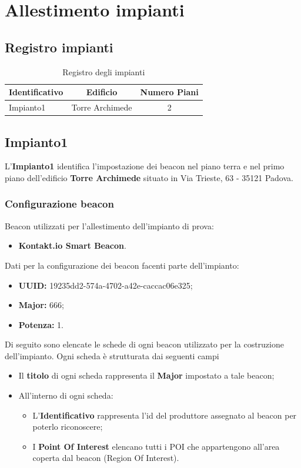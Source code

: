 \documentclass[../SperimentazioniPratiche.tex]{subfiles}
\begin{document}
\section{Allestimento impianti}
\label{sec:AllestimentoImpianto}

	\subsection{Registro impianti}
	
	\begin{table} [h]
		\centering
		\begin{tabular}{l|cc}
			\toprule
			\textbf{Identificativo} & \textbf{Edificio} & \textbf{Numero Piani}		\\
			\toprule
			Impianto1 & Torre Archimede & 2 \\
			\bottomrule
		\end{tabular}
		\caption{Registro degli impianti}
		\label{tab:RegistroImpianti}
	\end{table}
	
	
	\newpage
	\subsection{Impianto1}
		L'\textbf{Impianto1} identifica l'impostazione dei beacon nel piano terra e nel primo piano dell'edificio \textbf{Torre Archimede} situato in Via Trieste, 63 - 35121 Padova.
		
		\subsubsection{Configurazione beacon}
		Beacon utilizzati per l'allestimento dell'impianto di prova:
		\begin{itemize}
			\item[] \textbf{Kontakt.io Smart Beacon}.
		\end{itemize}
		Dati per la configurazione dei beacon facenti parte dell'impianto:
		\begin{itemize}
			\item[] \textbf{UUID:} 19235dd2-574a-4702-a42e-caccac06e325;
			\item[] \textbf{Major:} 666;
			\item[] \textbf{Potenza:} 1.
		\end{itemize}

		
		Di seguito sono elencate le schede di ogni beacon utilizzato per la costruzione dell'impianto. Ogni scheda è strutturata dai seguenti campi
		\begin{itemize}
			\item Il \textbf{titolo} di ogni scheda rappresenta il \textbf{Major} impostato a tale beacon;
			\item All'interno di ogni scheda:
			\begin{itemize}
				\item L'\textbf{Identificativo} rappresenta l'id del produttore assegnato al beacon per poterlo riconoscere;
				\item I \textbf{Point Of Interest} elencano tutti i POI che appartengono all'area coperta dal beacon (Region Of Interest).
			\end{itemize}
		\end{itemize}
		
\end{document}
